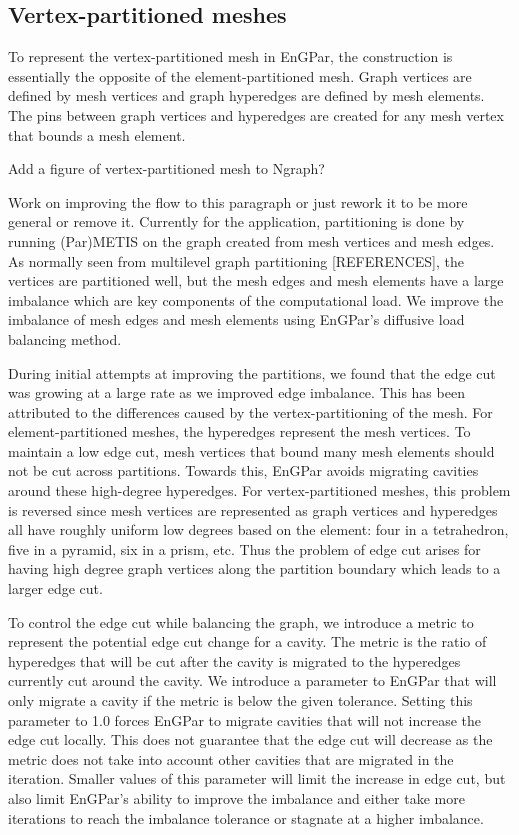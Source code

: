 \documentclass[conference]{IEEEtran}
\begin{document}
\subsection{Vertex-partitioned meshes}

To represent the vertex-partitioned mesh in EnGPar, the construction
is essentially the opposite of the element-partitioned mesh. Graph
vertices are defined by mesh vertices and graph hyperedges are defined
by mesh elements. The pins between graph vertices and hyperedges are
created for any mesh vertex that bounds a mesh element.

{\color{red} Add a figure of vertex-partitioned mesh to Ngraph?}

{\color{red} Work on improving the flow to this paragraph or just rework it to be more general or remove it.}
Currently for the application, partitioning is done by running (Par)METIS on the graph created
from mesh vertices and mesh edges. As normally seen from multilevel graph
partitioning [REFERENCES],
the vertices are partitioned well, but the mesh edges and mesh elements have a large
imbalance which are key components of the computational load. We improve the imbalance of
mesh edges and mesh elements using EnGPar's diffusive load balancing method.

During initial attempts at improving the partitions, we found that the edge cut was growing
at a large rate as we improved edge imbalance. This has been attributed to the differences
caused by the vertex-partitioning of the mesh. For element-partitioned meshes, the hyperedges
represent the mesh vertices. To maintain a low edge cut, mesh vertices that bound many mesh
elements should not be cut across partitions. Towards this, EnGPar avoids migrating cavities
around these high-degree hyperedges. For vertex-partitioned meshes, this problem is reversed
since mesh vertices are represented as graph vertices and hyperedges all have roughly uniform
low degrees based on the element: four in a tetrahedron, five in a pyramid, six in a prism, etc.
Thus the problem of edge cut arises for having high degree graph vertices along the partition
boundary which leads to a larger edge cut.

To control the edge cut while balancing the graph, we introduce a metric to represent the
potential edge cut change for a cavity. The metric is the ratio of hyperedges that will be cut
after the cavity is migrated to the hyperedges currently cut around the cavity. We introduce a
parameter to EnGPar that will only migrate a cavity if the metric is below the given tolerance.
Setting this parameter to 1.0 forces EnGPar to migrate cavities that will not increase the edge
cut locally. This does not guarantee that the edge cut will decrease as the metric does not take
into account other cavities that are migrated in the iteration. Smaller values of this
parameter will limit the increase in edge cut, but also limit EnGPar's ability to improve the
imbalance and either take more iterations to reach the imbalance tolerance or stagnate at a
higher imbalance.
\end{document}
